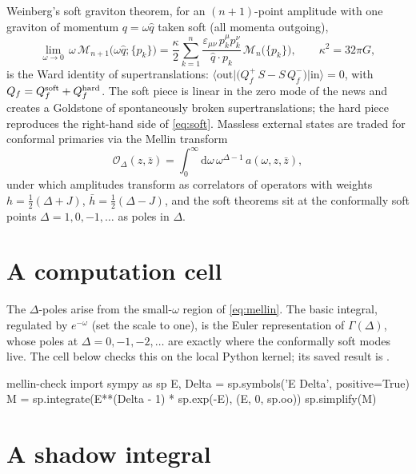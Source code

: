 \documentclass[11pt]{article}
\newcommand{\calO}{\mathcal{O}}
\newcommand{\calM}{\mathcal{M}}
\newcommand{\ket}[1]{\lvert #1 \rangle}
\newcommand{\bra}[1]{\langle #1 \rvert}
\newcommand{\dd}{\mathrm{d}}
\begin{document}
Weinberg's soft graviton theorem, for an $(n{+}1)$-point amplitude with
one graviton of momentum $q = \omega \hat q$ taken soft (all momenta
outgoing),
\begin{equation}
\lim_{\omega \to 0}\, \omega\, \calM_{n+1}\big(\omega\hat q;\{p_k\}\big)
 = \frac{\kappa}{2} \sum_{k=1}^{n}
   \frac{\varepsilon_{\mu\nu}\, p_k^\mu p_k^\nu}{\hat q \cdot p_k}\,
   \calM_n\big(\{p_k\}\big),
 \qquad \kappa^2 = 32\pi G,
\label{eq:soft}
\end{equation}
is the Ward identity of supertranslations:
$\bra{\mathrm{out}} \big( Q_f^+\, S - S\, Q_f^- \big) \ket{\mathrm{in}} = 0$,
with $Q_f = Q_f^{\rm soft} + Q_f^{\rm hard}$. The soft piece is linear
in the zero mode of the news and creates a Goldstone of spontaneously
broken supertranslations; the hard piece reproduces the right-hand side
of \eqref{eq:soft}. Massless external states are traded for conformal
primaries via the Mellin transform
\begin{equation}
\calO_{\Delta}(z,\bar z)
 = \int_0^\infty \dd\omega\, \omega^{\Delta-1}\, a(\omega, z, \bar z),
\label{eq:mellin}
\end{equation}
under which amplitudes transform as correlators of operators with
weights $h = \tfrac12(\Delta+J)$, $\bar h = \tfrac12(\Delta-J)$, and the
soft theorems sit at the conformally soft points $\Delta = 1, 0, -1,
\dots$ as poles in $\Delta$.

\section{A computation cell}

The $\Delta$-poles arise from the small-$\omega$ region of
\eqref{eq:mellin}. The basic integral, regulated by $e^{-\omega}$ (set
the scale to one), is the Euler representation of $\Gamma(\Delta)$,
whose poles at $\Delta = 0, -1, -2, \dots$ are exactly where the
conformally soft modes live. The cell below checks this on the local
Python kernel; its saved result is .

\begin{nb}[python]{mellin-check}
import sympy as sp
E, Delta = sp.symbols('E Delta', positive=True)
M = sp.integrate(E**(Delta - 1) * sp.exp(-E), (E, 0, sp.oo))
sp.simplify(M)
\end{nb}

\section{A shadow integral}
\end{document}
